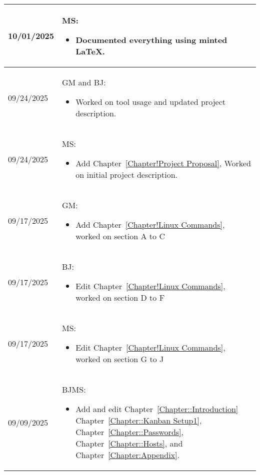 \begin{longtable}{|l||p{13.5cm}|}
10/01/2025 & MS:
\begin{itemize}[topsep=0pt,itemsep=0pt,parsep=0pt,partopsep=0pt,leftmargin=12pt]
\item Documented everything using minted LaTeX.
\end{itemize} 
\\ \hline

09/24/2025 & GM and BJ:
\begin{itemize}[topsep=0pt,itemsep=0pt,parsep=0pt,partopsep=0pt,leftmargin=12pt]
\item Worked on tool usage and updated project description.
\end{itemize} 
\\ \hline

09/24/2025 & MS:
\begin{itemize}[topsep=0pt,itemsep=0pt,parsep=0pt,partopsep=0pt,leftmargin=12pt]
\item Add  
Chapter~\ref{Chapter!Project Proposal}, Worked on initial project description.
\end{itemize} 
\\ \hline

09/17/2025 & GM:
\begin{itemize}[topsep=0pt,itemsep=0pt,parsep=0pt,partopsep=0pt,leftmargin=12pt]
\item Add  
Chapter~\ref{Chapter!Linux Commands}, worked on section A to C
\end{itemize} 
\\ \hline

09/17/2025 & BJ:
\begin{itemize}[topsep=0pt,itemsep=0pt,parsep=0pt,partopsep=0pt,leftmargin=12pt]
\item Edit  
Chapter~\ref{Chapter!Linux Commands}, worked on section D to F
\end{itemize} 
\\ \hline

09/17/2025 & MS:
\begin{itemize}[topsep=0pt,itemsep=0pt,parsep=0pt,partopsep=0pt,leftmargin=12pt]
\item Edit  
Chapter~\ref{Chapter!Linux Commands}, worked on section G to J
\end{itemize} 
\\ \hline


09/09/2025 & BJMS:
\begin{itemize}[topsep=0pt,itemsep=0pt,parsep=0pt,partopsep=0pt,leftmargin=12pt]
\item Add and edit 
Chapter~\ref{Chapter::Introduction}
Chapter~\ref{Chapter::Kanban Setup1},
Chapter~\ref{Chapter::Passwords},
Chapter~\ref{Chapter::Hosts},
and Chapter~\ref{Chapter:Appendix}.


\end{itemize}
\end{longtable}
